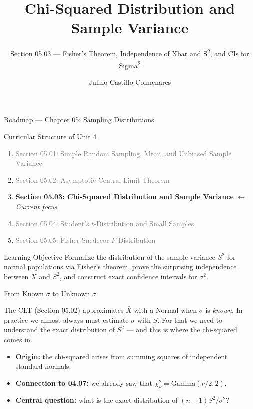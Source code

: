 \documentclass[aspectratio=169,xcolor={dvipsnames,table}]{beamer}
\title{Chi-Squared Distribution and Sample Variance}
\subtitle{Section 05.03 --- Fisher's Theorem, Independence of Xbar and S\textsuperscript{2}, and CIs for Sigma\textsuperscript{2}}
\author[J. Castillo Colmenares]{Juliho Castillo Colmenares}
\institute[Tec de Monterrey]{Tecnologico de Monterrey}
\date{\vspace{-1.5cm}}
\begin{document}
\begin{frame}[plain]
	\titlepage
\end{frame}

\begin{frame}{Roadmap --- Chapter 05: Sampling Distributions}
	\vspace{-0.15cm}
	\begin{block}{Curricular Structure of Unit 4}
		\footnotesize
		\begin{enumerate}\itemsep=0.03cm
			\item \textcolor{gray}{Section 05.01: Simple Random Sampling, Mean, and Unbiased Sample Variance}
			\item \textcolor{gray}{Section 05.02: Asymptotic Central Limit Theorem}
			\item \textbf{\textcolor{TecRojo}{Section 05.03: Chi-Squared Distribution and Sample Variance}} $\leftarrow$ \emph{Current focus}
			\item \textcolor{gray}{Section 05.04: Student's $t$-Distribution and Small Samples}
			\item \textcolor{gray}{Section 05.05: Fisher-Snedecor $F$-Distribution}
		\end{enumerate}
	\end{block}
	\vspace{-0.2cm}
	\begin{alertblock}{Learning Objective}
		\scriptsize
		Formalize the distribution of the sample variance $S^2$ for normal populations via Fisher's theorem, prove the surprising independence between $\bar{X}$ and $S^2$, and construct exact confidence intervals for $\sigma^2$.
	\end{alertblock}
\end{frame}

\begin{frame}{From Known $\sigma$ to Unknown $\sigma$}
	\footnotesize
	\begin{motivacion}
		The CLT (Section 05.02) approximates $\bar{X}$ with a Normal when $\sigma$ is \emph{known}. In practice we almost always must estimate $\sigma$ with $S$. For that we need to understand the exact distribution of $S^2$ --- and this is where the chi-squared comes in.
	\end{motivacion}
	\vspace{0.15cm}
	\pause
	\begin{itemize}\itemsep=0.1cm
		\item \textbf{Origin:} the chi-squared arises from summing squares of independent standard normals. \pause
		\item \textbf{Connection to 04.07:} we already saw that $\chi^2_\nu = \text{Gamma}(\nu/2, 2)$. \pause
		\item \textbf{Central question:} what is the exact distribution of $(n-1)S^2/\sigma^2$?
	\end{itemize}
\end{frame}
\end{document}
